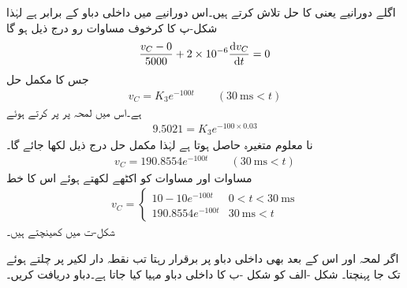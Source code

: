 اگلے دورانیے یعنی  کا حل تلاش کرتے ہیں۔اس دورانیے میں داخلی دباو  کے برابر ہے لہٰذا شکل-پ کا کرخوف مساوات رو درج ذیل ہو گا
\begin{align*}
\frac{v_C-0}{5000}+2\times10^{-6}\frac{\dif v_C}{\dif t}=0
\end{align*}
جس کا مکمل حل
\begin{align*}
v_C=K_3e^{-100t} \quad \quad (\SI{30}{\milli\second}< t)
\end{align*}
ہے۔اس میں لمحہ  پر  پر کرتے  ہوئے
\begin{align*}
9.5021=K_3 e^{-100\times 0.03}
\end{align*}
نا معلوم متغیرہ  حاصل ہوتا ہے لہٰذا مکمل حل درج ذیل لکھا جائے گا۔
\begin{align}\label{مساوات_عارضی_مستطیل_مثال_حل_ب}
v_C=190.8554e^{-100t} \quad \quad (\SI{30}{\milli\second}< t)
\end{align}
مساوات  اور مساوات  کو اکٹھے لکھتے  ہوئے اس کا خط
\begin{align}
v_C=
\begin{cases}
10-10e^{-100t}& 0<t<\SI{30}{\milli\second}\\
190.8554e^{-100t} & \SI{30}{\milli\second}< t
\end{cases}
\end{align}
شکل-ت میں کھینچتے ہیں۔

اگر لمحہ  اور اس کے بعد بھی داخلی دباو  پر برقرار رہتا تب  نقطہ دار لکیر پر چلتے ہوئے  تک جا پہنچتا۔    
شکل -الف کو شکل -ب کا داخلی دباو مہیا کیا جاتا ہے۔دباو  دریافت کریں۔

